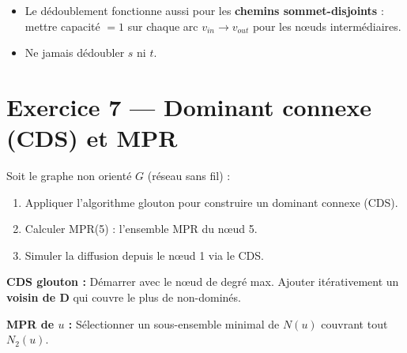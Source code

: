 \documentclass[12pt,a4paper]{article}
\begin{document}
\begin{attention}
\begin{itemize}
    \item Le d\'edoublement fonctionne aussi pour les \textbf{chemins sommet-disjoints} : mettre capacit\'e $= 1$ sur chaque arc $v_{in} \to v_{out}$ pour les n\oe uds interm\'ediaires.
    \item Ne jamais d\'edoubler $s$ ni $t$.
\end{itemize}
\end{attention}


\newpage
\section{Exercice 7 --- Dominant connexe (CDS) et MPR}

\begin{enonce}
Soit le graphe non orient\'e $G$ (r\'eseau sans fil) :

\begin{center}
\end{center}

\begin{enumerate}
    \item Appliquer l'algorithme glouton pour construire un dominant connexe (CDS).
    \item Calculer MPR(5) : l'ensemble MPR du n\oe ud 5.
    \item Simuler la diffusion depuis le n\oe ud 1 via le CDS.
\end{enumerate}
\end{enonce}

\begin{methode}
\textbf{CDS glouton :} D\'emarrer avec le n\oe ud de degr\'e max. Ajouter it\'erativement un \textbf{voisin de D} qui couvre le plus de non-domin\'es.

\textbf{MPR de $u$ :} S\'electionner un sous-ensemble minimal de $N(u)$ couvrant tout $N_2(u)$.
\end{methode}
\end{document}
